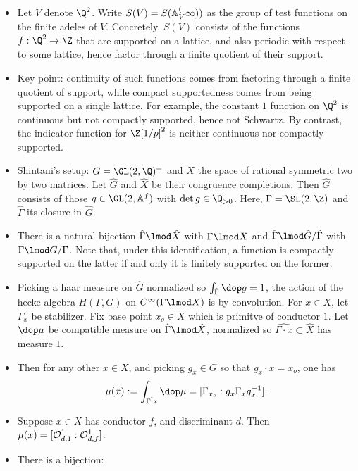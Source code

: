 \documentclass[11pt]{amsart}
\begin{document}
\begin{itemize}
	\item Let $V$ denote $\Q^2$. Write $S(V)=S(\mathbb{A}_V^(\infty))$ as the group of test functions on the finite adeles of $V$. Concretely, $S(V)$ consists of the functions $f:\Q^2\to \Z$ that are supported on a lattice, and also periodic with respect to some lattice, hence factor through a finite quotient of their support.
	\item Key point: continuity of such functions comes from factoring through a finite quotient of support, while compact supportedness comes from being supported on a single lattice. For example, the constant $1$ function on $\Q^2$ is continuous but not compactly supported, hence not Schwartz. By contrast, the indicator function for $\Z[1/p]^2$ is neither continuous nor compactly supported. 
	\item Shintani's setup: $G=\GL(2,\Q)^+$ and $X$ the space of rational symmetric two by two matrices. Let $\hat{G}$ and $\hat{X}$ be their congruence completions. Then $\hat{G}$ consists of those $g\in \GL(2,\Adeles^f)$ with $\det g \in \Q_{>0}$. Here, $\Gamma=\SL(2,\Z)$ and $\hat{\Gamma}$ its closure in $\hat{G}$. 
	\item There is a natural bijection $\hat{\Gamma}\lmod \hat{X}$ with $\Gamma \lmod X$ and $\hat{\Gamma}\lmod \hat{G} / \hat{\Gamma}$ with $\Gamma \lmod G / \Gamma$. Note that, under this identification, a function is compactly supported on the latter if and only it is finitely supported on the former. 
	\item Picking a haar measure on $\hat{G}$ normalized so $\int_{\hat{\Gamma}} \dop g=1$, the action of the hecke algebra $H(\Gamma,G)$ on $C^\infty(\Gamma \lmod X)$  is by convolution. For $x\in X$, let $\Gamma_x$ be stabilizer. Fix base point $x_o \in X$ which is primitve of conductor $1$. Let $\dop \mu$ be compatible measure on $\hat{\Gamma} \lmod \hat{X}$, normalized so $\hat{\Gamma \cdot x} \subset \hat{X}$ has measure $1$. 
	\item Then for any other $x\in X$, and picking $g_x \in G$ so that $g_x \cdot x= x_o$, one has 
	\begin{align*}
		\mu(x):= \int_{\hat{\Gamma \cdot x}} \dop \mu =|\Gamma_{x_o} : g_x \Gamma_x g_x^{-1}].  
	\end{align*}
	\item Suppose $x\in X$ has conductor $f$, and discriminant $d$. Then $\mu(x)=[\mathcal{O}^1_{d,1}:\mathcal{O}_{d,f}^1]$. 
	\item There is a bijection: 
		\begin{align*}

\end{align*}
\end{itemize}
\end{document}
